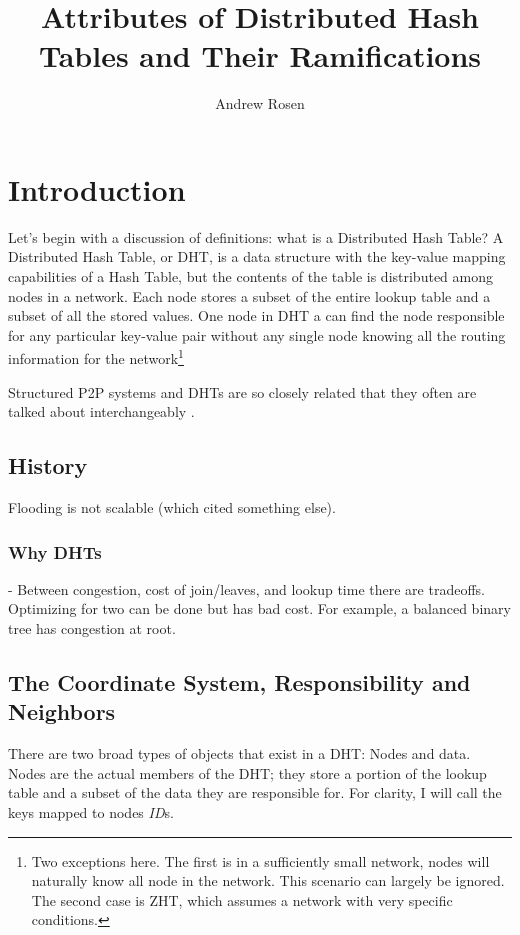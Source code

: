 \documentclass[10pt,letterpaper]{report}
\author{Andrew Rosen}
\title{Attributes of Distributed Hash Tables and Their Ramifications}
\begin{document}
\maketitle
\setcounter{tocdepth}{4}



\tableofcontents

\chapter{Introduction}
Let's begin with a discussion of definitions:  what is a Distributed Hash Table?
A Distributed Hash Table, or DHT, is a data structure with the key-value mapping capabilities of a Hash Table, but the contents of the table is distributed among nodes in a network.
Each node stores a subset of the entire lookup table and a subset of all the stored values.
One node in DHT a can find the node responsible for any particular key-value pair without any single node knowing all the routing information for the network\footnote{Two exceptions here.  
The first is in a sufficiently small network, nodes will naturally know  all node in the network. This scenario can largely be ignored.  The second case is ZHT, which assumes a network with very specific conditions.}


Structured P2P systems and DHTs are so closely related that they often are talked about interchangeably  \cite{wu2004handbook} \cite{lua2005survey}. 


\section{History}

Flooding is not scalable \cite{can} (which cited something else).


\subsection{Why DHTs}
\cite{malkhi2001viceroy} -  Between congestion, cost of join/leaves, and lookup time there are tradeoffs.  
Optimizing for two can be done but has bad cost.
For example, a balanced binary tree has congestion at root.


\section{The Coordinate System, Responsibility and Neighbors}


There are two  broad types of objects that exist in a DHT: Nodes and data.  
Nodes are the actual members of the DHT; they store a portion of the lookup table and a subset of the data they are responsible for. 
For clarity, I will call the keys mapped to nodes \textit{ID}s. 
\end{document}
